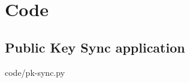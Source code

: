 \chapter{Code}\label{apx:code}

\section{Public Key Sync application}

\begin{lstinputlisting}
[language=Python]{code/pk-sync.py}
\end{lstinputlisting}